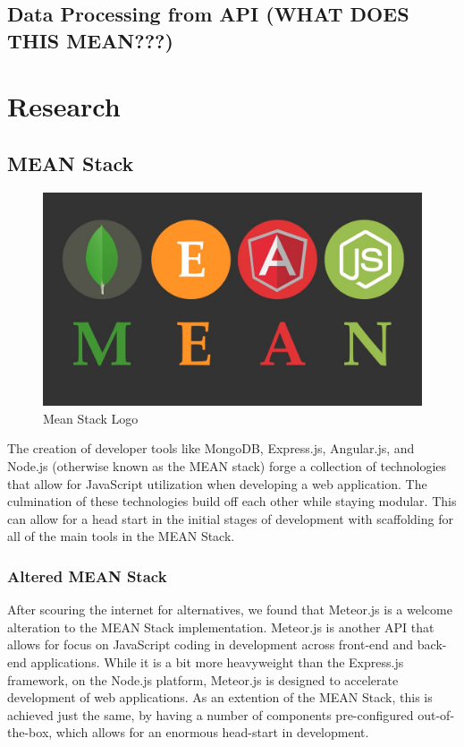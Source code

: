 \documentclass[12pt,a4paper]{report}
\begin{document}
	\section{Data Processing from API (WHAT DOES THIS MEAN???)}

\newpage
\chapter*{Research}
	\section{MEAN Stack}
	\begin{figure}[!h]
		\centering
		\includegraphics[scale=.2]{meanStack}
		\caption{Mean Stack Logo}
		\label{fig: Mean Stack Logo}
	\end{figure}
	The creation of developer tools like MongoDB, Express.js, Angular.js, and Node.js (otherwise known as the MEAN stack) forge a collection of technologies that allow for JavaScript utilization when developing a web application. The culmination of these technologies build off each other while staying modular. This can allow for a head start in the initial stages of development with scaffolding for all of the main tools in the MEAN Stack.
	
		\subsection{Altered MEAN Stack}
		After scouring the internet for alternatives, we found that Meteor.js is a welcome alteration to the MEAN Stack implementation. Meteor.js is another API that allows for focus on JavaScript coding in development across front-end and back-end applications. While it is a bit more heavyweight than the Express.js framework, on the Node.js platform, Meteor.js is designed to accelerate development of web applications. As an extention of the MEAN Stack, this is achieved just the same, by having a number of components pre-configured out-of-the-box, which allows for an enormous head-start in development.
			\newpage
\end{document}
